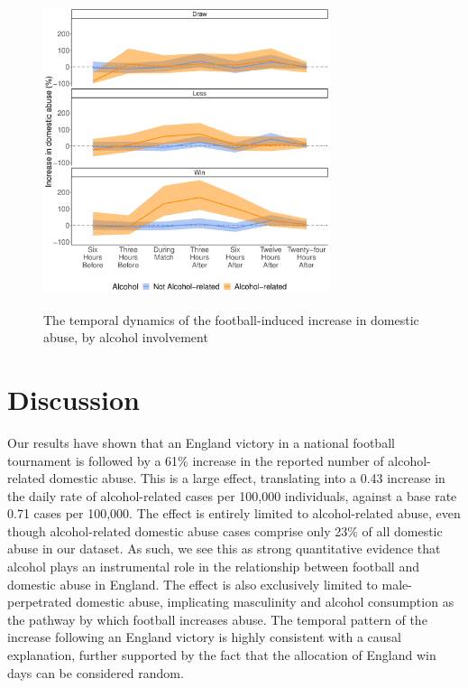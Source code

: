 \documentclass[12pt, letterpaper]{article}
\newcommand{\AT}[1] {{\textcolor{blue}{#1}}}
\begin{document}
\begin{figure}
\centering
 \caption{The temporal dynamics of the football-induced increase in domestic abuse, by alcohol involvement}
\includegraphics[width=0.75\textwidth]{Threehours.pdf}
\label{fig:threehours}
\end{figure}

\newpage

\section*{Discussion}

Our results have shown that an England victory in a national football tournament is followed by a 61\% increase in the reported number of alcohol-related domestic abuse. This is a large effect, translating into a 0.43 increase in the daily rate of alcohol-related cases per 100,000 individuals, against a base rate 0.71 cases per 100,000. The effect is entirely limited to alcohol-related abuse, even though alcohol-related domestic abuse cases comprise only 23\% of all domestic abuse in our dataset. As such, we see this as strong quantitative evidence that alcohol plays an instrumental role in the relationship between football and domestic abuse in England. The effect is also exclusively limited to male-perpetrated domestic abuse, implicating masculinity and alcohol consumption as the pathway by which football increases abuse. The temporal pattern of the increase following an England victory is highly consistent with a causal explanation, further supported by the fact that the allocation of England win days can be considered random. %
\end{document}
